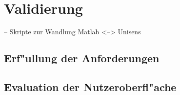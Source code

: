 \chapter{Validierung}
\label{chap:validierung}



-- Skripte zur Wandlung Matlab <--> Unisens

\section{Erf"ullung der Anforderungen}
\label{sec:anforderungsvalidierung}

\section{Evaluation der Nutzeroberfl"ache}






